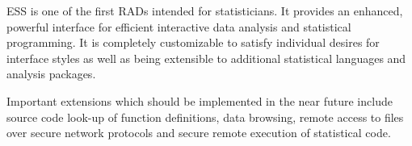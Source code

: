 \documentclass{article}
\begin{document}
ESS is one of the first RADs intended for statisticians.  It provides
an enhanced, powerful interface for efficient interactive data
analysis and statistical programming.  It is completely customizable
to satisfy individual desires for interface styles as well as being
extensible to additional statistical languages and analysis packages.

Important extensions which should be implemented in the near future 
include source code look-up of function definitions, data browsing, 
remote access to files over secure network protocols and secure remote 
execution of statistical code.
\end{document}
